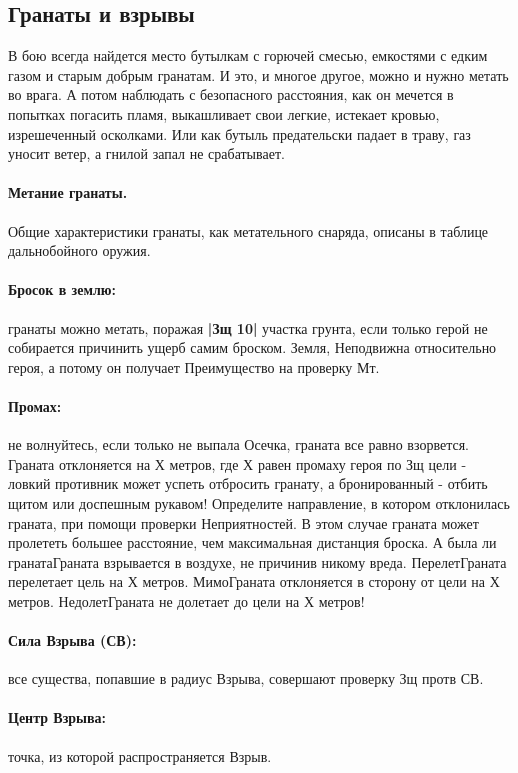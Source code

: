 \subsection{Гранаты и взрывы}
В бою всегда найдется место бутылкам с горючей смесью, емкостями с едким газом и старым добрым гранатам. И это, и многое другое, можно и нужно метать во врага. А потом наблюдать с безопасного расстояния, как он мечется в попытках погасить пламя, выкашливает свои легкие, истекает кровью, изрешеченный осколками. Или как бутыль предательски падает в траву, газ уносит ветер, а гнилой запал не срабатывает.
\paragraph{Метание гранаты.} Общие характеристики гранаты, как метательного снаряда, описаны в таблице дальнобойного оружия.

\paragraph{Бросок в землю:} гранаты можно метать, поражая \textbf{|Зщ 10|} участка грунта, если только герой не собирается причинить ущерб самим броском. Земля, Неподвижна относительно героя, а потому он получает Преимущество на проверку Мт.
\paragraph{Промах:} не волнуйтесь, если только не выпала Осечка, граната все равно взорвется. Граната отклоняется на Х метров, где Х равен промаху героя по Зщ цели - ловкий противник может успеть отбросить гранату, а бронированный - отбить щитом или доспешным рукавом! Определите направление, в котором отклонилась граната, при помощи проверки Неприятностей. В этом случае граната может пролететь большее расстояние, чем максимальная дистанция броска.
\trouble
{А была ли граната}{Граната взрывается в воздухе, не причинив никому вреда.}
{Перелет}{Граната перелетает цель на Х метров.}
{Мимо}{Граната отклоняется в сторону от цели на Х метров.}
{Недолет}{Граната не долетает до цели на Х метров!}

\paragraph{Сила Взрыва (СВ):} все существа, попавшие в радиус Взрыва, совершают проверку Зщ протв СВ. 
\paragraph{Центр Взрыва:} точка, из которой распространяется Взрыв.
